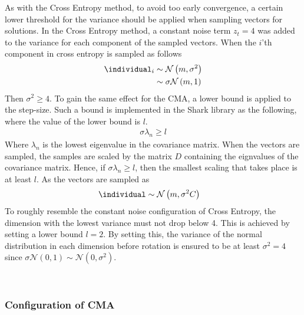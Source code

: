 As with the Cross Entropy method, to avoid too early convergence, a 
certain lower threshold for the variance should be applied when 
sampling vectors for solutions. In the Cross Entropy method, a constant 
noise term $z_t = 4$ was added to the variance for each component
of the sampled vectors. When the $i$'th component in cross entropy is
sampled as follows
\begin{align*}
\individual_i &\sim \mathcal{N}\left(m, \sigma^{2}\right)\\
              &\sim \sigma \mathcal{N}\left(m, 1\right)
\end{align*}
Then $\sigma^{2} \geq 4$. To gain the same effect for the CMA, a lower bound 
is applied to the step-size. Such a bound is implemented in the Shark library
as the following, where the value of the lower bound is $l$.
\begin{align*}
\sigma  \lambda_n \geq l
\end{align*}
Where $\lambda_n$ is the lowest eigenvalue in the covariance matrix. 
When the vectors are sampled, the samples are scaled by the matrix $D$
containing the eignvalues of the covariance matrix. 
Hence, if $\sigma \lambda_n \geq l$, then the smallest scaling
that takes place is at least $l$. As the vectors are sampled
as
\begin{align*}
\individual &\sim \mathcal{N}\left( m, \sigma^{2}C \right)
\end{align*}
To roughly resemble the constant noise configuration of Cross Entropy,
the dimension with the lowest variance must not drop below 4. 
This is achieved by setting a lower bound $l=2$. By setting this, 
the variance of the normal distribution in each dimension 
before rotation is ensured to be at least $\sigma^{2} = 4$
since $\sigma \mathcal{N}\left( 0, 1 \right) \sim 
\mathcal{N}\left( 0, \sigma^{2} \right)$.



\\


\subsubsection{Configuration of CMA}

